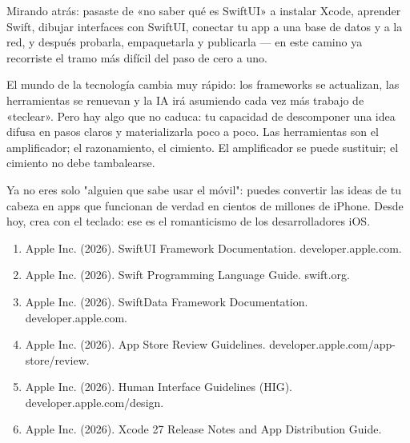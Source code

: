 
Mirando atrás: pasaste de «no saber qué es SwiftUI» a instalar Xcode, aprender Swift, dibujar interfaces con SwiftUI, conectar tu app a una base de datos y a la red, y después probarla, empaquetarla y publicarla — en este camino ya recorriste el tramo más difícil del paso de cero a uno.

El mundo de la tecnología cambia muy rápido: los frameworks se actualizan, las herramientas se renuevan y la IA irá asumiendo cada vez más trabajo de «teclear». Pero hay algo que no caduca: tu capacidad de descomponer una idea difusa en pasos claros y materializarla poco a poco. Las herramientas son el amplificador; el razonamiento, el cimiento. El amplificador se puede sustituir; el cimiento no debe tambalearse.

Ya no eres solo "alguien que sabe usar el móvil": puedes convertir las ideas de tu cabeza en apps que funcionan de verdad en cientos de millones de iPhone. Desde hoy, crea con el teclado: ese es el romanticismo de los desarrolladores iOS.


\begin{enumerate}
  \item Apple Inc. (2026). SwiftUI Framework Documentation. developer.apple.com.
  \item Apple Inc. (2026). Swift Programming Language Guide. swift.org.
  \item Apple Inc. (2026). SwiftData Framework Documentation. developer.apple.com.
  \item Apple Inc. (2026). App Store Review Guidelines. developer.apple.com/app-store/review.
  \item Apple Inc. (2026). Human Interface Guidelines (HIG). developer.apple.com/design.
  \item Apple Inc. (2026). Xcode 27 Release Notes and App Distribution Guide.
\end{enumerate}
